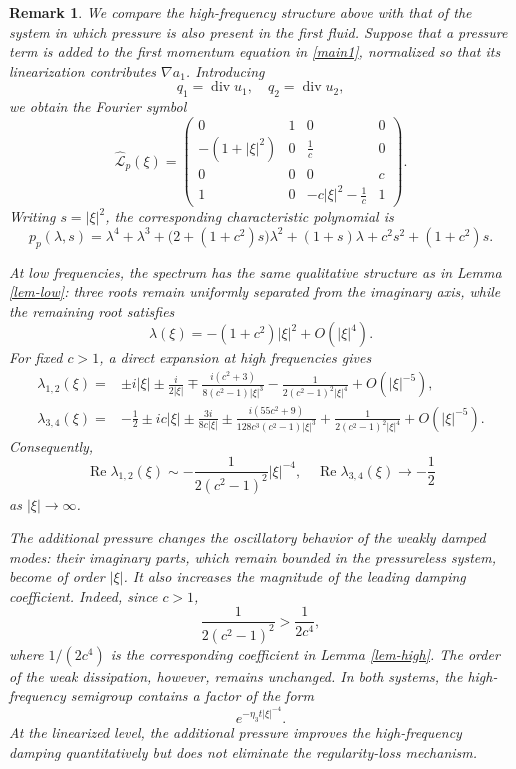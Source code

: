 \documentclass[10pt,reqno]{amsart}
\numberwithin{equation}{section}
\newtheorem{rem}{Remark}[section]
\begin{document}
\begin{rem}  
We compare the high-frequency structure above with that of the system in which pressure is also present in the first fluid. Suppose that a pressure term is added to the first momentum equation in \eqref{main1}, normalized so that its linearization contributes $\nabla a_1$. Introducing
\[
q_1=\operatorname{div}u_1,
\quad
q_2=\operatorname{div}u_2,
\]
we obtain the Fourier symbol
\[
\widehat{\mathcal L}_p(\xi)=
\begin{pmatrix}
0&1&0&0\\
-(1+|\xi|^2)&0&\frac{1}{c}&0\\
0&0&0&c\\
1&0&-c|\xi|^2-\frac{1}{c}&1
\end{pmatrix}.
\]
Writing $s=|\xi|^2$, the corresponding characteristic polynomial is
\[
p_p(\lambda,s)
=
\lambda^4+\lambda^3
+\bigl(2+(1+c^2)s\bigr)\lambda^2
+(1+s)\lambda
+c^2s^2+(1+c^2)s.
\]

At low frequencies, the spectrum has the same qualitative structure as in Lemma \ref{lem-low}: three roots remain uniformly separated from the imaginary axis, while the remaining root satisfies
\[
\lambda(\xi)
=-(1+c^2)|\xi|^2+O(|\xi|^4).
\]
For fixed $c>1$, a direct expansion at high frequencies gives
\[
\begin{aligned}
\lambda_{1,2}(\xi)
={}&
\pm i|\xi|
\pm\frac{i}{2|\xi|}
\mp\frac{i(c^2+3)}
{8(c^2-1)|\xi|^3}
-\frac{1}
{2(c^2-1)^2|\xi|^4}
+O(|\xi|^{-5}),\\
\lambda_{3,4}(\xi)
={}&
-\frac12
\pm ic|\xi|
\pm\frac{3i}{8c|\xi|}
\pm\frac{i(55c^2+9)}
{128c^3(c^2-1)|\xi|^3}
+\frac{1}
{2(c^2-1)^2|\xi|^4}
+O(|\xi|^{-5}).
\end{aligned}
\]
Consequently,
\[
\operatorname{Re}\lambda_{1,2}(\xi)
\sim
-\frac{1}{2(c^2-1)^2}|\xi|^{-4},
\quad
\operatorname{Re}\lambda_{3,4}(\xi)
\longrightarrow-\frac12
\]
as $|\xi|\to\infty$.

The additional pressure changes the oscillatory behavior of the weakly
damped modes: their imaginary parts, which remain bounded in the
pressureless system, become of order $|\xi|$. It also increases the
magnitude of the leading damping coefficient. Indeed, since $c>1$,
\[
\frac{1}{2(c^2-1)^2}
>
\frac{1}{2c^4},
\]
where $1/(2c^4)$ is the corresponding coefficient in
Lemma \ref{lem-high}. The order of the weak dissipation, however, remains
unchanged. In both systems, the high-frequency semigroup contains a factor
of the form
\[
e^{-\eta_3  t|\xi|^{-4}}.
\]
At the linearized level, the additional pressure improves the
high-frequency damping quantitatively but does not eliminate the
regularity-loss mechanism.
\end{rem}
\end{document}
